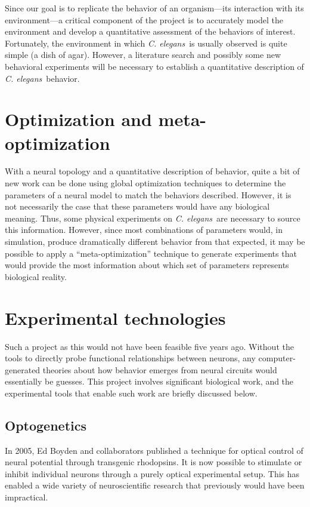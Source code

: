 \documentclass[letter,11pt]{article}
\newcommand{\cel}{{\em C. elegans}}
\begin{document}
Since our goal is to replicate the behavior of an organism---its interaction with
its environment---a critical component of the project is to accurately model the
environment and develop a quantitative assessment of the behaviors of interest.
Fortunately, the environment in which \cel\ is usually observed is quite simple
(a dish of agar). However, a literature search and possibly some new behavioral
experiments will be necessary to establish a quantitative description of \cel\ 
behavior.

\section{Optimization and meta-optimization}

With a neural topology and a quantitative description of behavior, quite a bit
of new work can be done using global optimization techniques to determine the
parameters of a neural model to match the behaviors described. However, it is
not necessarily the case that these parameters would have any biological
meaning. Thus, some physical experiments on \cel\ are necessary to source this
information. However, since most combinations of parameters would, in simulation,
produce dramatically different behavior from that expected, it may be possible to
apply a ``meta-optimization'' technique to generate experiments that would 
provide the most information about which set of parameters represents biological
reality.

\section{Experimental technologies}

Such a project as this would not have been feasible five years ago. Without the
tools to directly probe functional relationships between neurons, any computer-
generated theories about how behavior emerges from neural circuits would
essentially be guesses. This project involves significant biological work, and
the experimental tools that enable such work are briefly discussed below.

\subsection{Optogenetics}

In 2005, Ed Boyden and collaborators published \cite{boyden} a technique for
optical control of neural potential through transgenic rhodopsins. It is now
possible to stimulate or inhibit individual neurons through a purely optical
experimental setup. This has enabled a wide variety of neuroscientific research
that previously would have been impractical.
\end{document}
